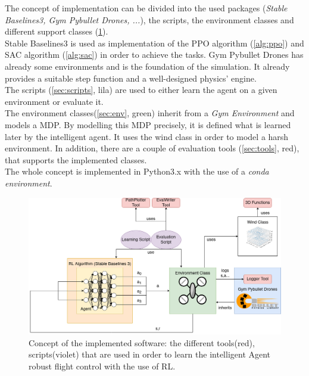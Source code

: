 The concept of implementation can be divided into the used packages 
(\emph{Stable Baselines3, Gym Pybullet Drones, ...}), the scripts, the environment classes and different support classes (\cref{fig:concept}).\\
Stable Baselines3 is used as implementation of the PPO algorithm (\cref{alg:ppo}) and SAC algorithm (\cref{alg:sac}) in order to achieve the tasks. 
Gym Pybullet Drones has already some environments and is the foundation of the simulation. 
It already provides a suitable step function and a well-designed physics' engine.\\
The scripts (\cref{sec:scripts}, lila) are used to either learn the agent on a given environment or evaluate it.\\
The environment classes(\cref{sec:env}, green) inherit from a \emph{Gym Environment} and models a MDP. 
By modelling this MDP precisely, it is defined what is learned later by the intelligent agent. 
It uses the wind class in order to model a harsh environment.
In addition, there are a couple of evaluation tools (\cref{sec:tools}, red), that supports the implemented classes.\\
\newline
The whole concept is implemented in Python3.x with the use of a \emph{conda environment}.

\begin{figure}[htp]
	\centering
	\includegraphics[width= \linewidth]{figures/concept.png}
	\caption{Concept of the implemented software: the different tools(red), 
	scripts(violet) that are used in order to learn the intelligent Agent robust flight control with the use of RL.}
	\label{fig:concept}
\end{figure}
\newpage

